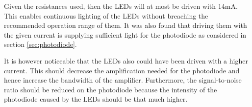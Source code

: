 Given the resistances used, then the LEDs will at most be driven with 14mA.
This enables continuous lighting of the LEDs without breaching the recommended operation range of them.
It was also found that driving them with the given current is supplying sufficient light for the photodiode as considered in section \ref{sec:photodiode}.


It is however noticeable that the LEDs also could have been driven with a higher current.
This should decrease the amplification needed for the photodiode and hence increase the bandwidth of the amplifier.
Furthermore, the signal-to-noise ratio should be reduced on the photodiode because the intensity of the photodiode caused by the LEDs should be that much higher.

